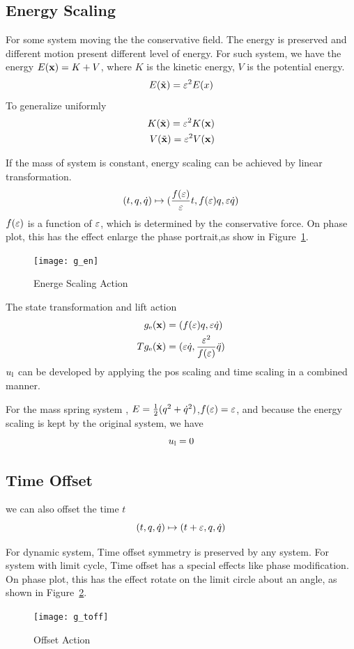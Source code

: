 \subsection*{Energy Scaling}
For some system moving the the conservative field.
The energy is preserved and different motion present different level of energy.
For such system, we have the energy $E(\mathbf{x})=K+V$, where $K$ is the kinetic energy,
$V$ is the potential energy.
\[
E(\tilde{\mathbf{x}})=\varepsilon^2 E(x)
\]
To generalize uniformly
\begin{align}
K(\tilde{\mathbf{x}})=\varepsilon^2 K(\mathbf{x}) \nonumber\\
V(\tilde{\mathbf{x}})=\varepsilon^2 V(\mathbf{x}) \nonumber
\end{align}


If the mass of system is constant, energy scaling can be achieved by linear transformation.
\[
(t,q,\dot{q} ) \mapsto ( \frac{f(\varepsilon)}{\varepsilon}t ,f(\varepsilon)q,\varepsilon\dot{q})
\]
$f(\varepsilon)$ is a function of $\varepsilon$, which is determined by the conservative force.
On phase plot, this has the effect enlarge the phase portrait,as show in Figure~\ref{fig:gen}.
\begin{figure}[!htbp]
  \begin{center}
      \texttt{[image: g\_en]}
    \caption{Energe Scaling Action}
    \label{fig:gen}
\end{center}
\end{figure}

The state transformation and lift action
\begin{align}
g_{\mathrm{e}}(\mathbf{x})&=(f(\varepsilon) q,\varepsilon \dot{q}) \nonumber\\
Tg_{\mathrm{e}}(\dot{\mathbf{x}})&=(\varepsilon \dot{q},\frac{\varepsilon^2}{f(\varepsilon)}\ddot{q})
\end{align}
$u_{\mathrm{l}}$ can be developed by applying the pos scaling and time scaling in a combined manner.



For the mass spring system , $E=\frac{1}{2}(q^2+\dot{q}^2)$,$f(\varepsilon)=\varepsilon$, and because the energy scaling is kept by the original system, we have
\[
u_{\mathrm{l}}=0
\]



\subsection*{Time Offset}
we can also offset the time $t$
\[
(t,q,\dot{q}) \mapsto (t+\varepsilon,q,\dot{q})
\]

For dynamic system, Time offset symmetry is preserved by any system.
For system with limit cycle, Time offset has a special effects like phase modification.
On phase plot, this has the effect rotate on the limit circle about an angle, as shown in Figure~\ref{fig:gtoff}.
\begin{figure}
  \begin{center}
      \texttt{[image: g\_toff]}
    \caption{Offset Action}
    \label{fig:gtoff}
\end{center}
\end{figure}





